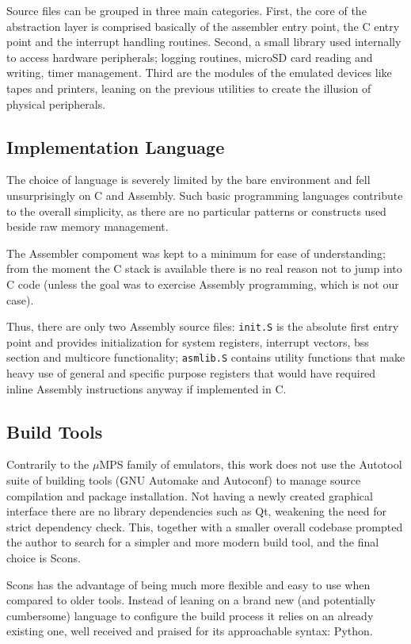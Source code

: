 \documentclass[12pt,a4paper,openright,twoside]{report}
\begin{document}
Source files can be grouped in three main categories. First, the core of the abstraction
layer is comprised basically of the assembler entry point, the C entry point and
the interrupt handling routines. Second, a small library used internally to 
access hardware peripherals; logging routines, microSD card reading and writing, 
timer management. Third are the modules of the emulated devices like tapes and
printers, leaning on the previous utilities to create the illusion of physical
peripherals.

\subsection{Implementation Language}
The choice of language is severely limited by the bare environment and fell unsurprisingly
on C and Assembly. Such basic programming languages contribute to the overall simplicity,
as there are no particular patterns or constructs used beside raw memory management.

The Assembler compoment was kept to a minimum for ease of understanding; from
the moment the C stack is available there is no real reason not to jump into 
C code (unless the goal was to exercise Assembly programming, which is not our case).

Thus, there are only two Assembly source files: {\tt init.S} is the absolute first
entry point and provides initialization for system registers, interrupt vectors, 
bss section and multicore functionality; {\tt asmlib.S} contains utility functions
that make heavy use of general and specific purpose registers that would have
required inline Assembly instructions anyway if implemented in C.

\subsection{Build Tools}
Contrarily to the $\mu$MPS family of emulators, this work does not use the 
Autotool suite of building tools (GNU Automake and Autoconf) to manage source 
compilation and package installation.
Not having a newly created graphical interface there are no library dependencies
such as Qt, weakening the need for strict dependency check. 
This, together with a smaller overall codebase prompted the author to search 
for a simpler and more modern build tool, and the final choice is Scons.

Scons has the advantage of being much more flexible and easy to use when compared
to older tools. Instead of leaning on a brand new (and potentially cumbersome)
language to configure the build process it relies on an already existing one, well
received and praised for its approachable syntax: Python.
\end{document}
